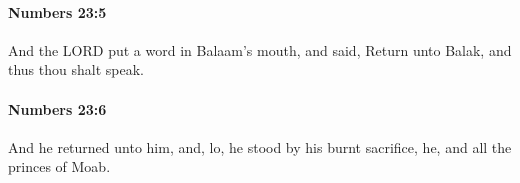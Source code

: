 		\paragraph{Numbers 23:5} %
			\label{NUMBERS-23-5}

			And the LORD put a word in Balaam’s mouth, and said, Return unto Balak, and thus thou shalt speak.


		\paragraph{Numbers 23:6} %
			\label{NUMBERS-23-6}

			And he returned unto him, and, lo, he stood by his burnt sacrifice, he, and all the princes of Moab.


